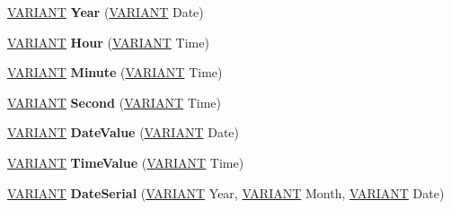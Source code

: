 \begin{DoxyCompactItemize}
\hyperlink{structtag_v_a_r_i_a_n_t}{V\+A\+R\+I\+A\+NT} {\bfseries Year} (\hyperlink{structtag_v_a_r_i_a_n_t}{V\+A\+R\+I\+A\+NT} Date)
\item 
\mbox{\label{interface_v_b_script___global_1_1_global_obj_aee82cbdab554729b176b380cff3f143f}} 
\hyperlink{structtag_v_a_r_i_a_n_t}{V\+A\+R\+I\+A\+NT} {\bfseries Hour} (\hyperlink{structtag_v_a_r_i_a_n_t}{V\+A\+R\+I\+A\+NT} Time)
\item 
\mbox{\label{interface_v_b_script___global_1_1_global_obj_a316ecab267814f6e0b081ad0740ccdc8}} 
\hyperlink{structtag_v_a_r_i_a_n_t}{V\+A\+R\+I\+A\+NT} {\bfseries Minute} (\hyperlink{structtag_v_a_r_i_a_n_t}{V\+A\+R\+I\+A\+NT} Time)
\item 
\mbox{\label{interface_v_b_script___global_1_1_global_obj_a0d2ee36f36cf62c7a64e74f054848795}} 
\hyperlink{structtag_v_a_r_i_a_n_t}{V\+A\+R\+I\+A\+NT} {\bfseries Second} (\hyperlink{structtag_v_a_r_i_a_n_t}{V\+A\+R\+I\+A\+NT} Time)
\item 
\mbox{\label{interface_v_b_script___global_1_1_global_obj_a481d0c971359566ee5661ef782550bd5}} 
\hyperlink{structtag_v_a_r_i_a_n_t}{V\+A\+R\+I\+A\+NT} {\bfseries Date\+Value} (\hyperlink{structtag_v_a_r_i_a_n_t}{V\+A\+R\+I\+A\+NT} Date)
\item 
\mbox{\label{interface_v_b_script___global_1_1_global_obj_acacd0567e03b9e4127a838db6a38ef10}} 
\hyperlink{structtag_v_a_r_i_a_n_t}{V\+A\+R\+I\+A\+NT} {\bfseries Time\+Value} (\hyperlink{structtag_v_a_r_i_a_n_t}{V\+A\+R\+I\+A\+NT} Time)
\item 
\mbox{\label{interface_v_b_script___global_1_1_global_obj_aaf3da47031ee6c176d3e193d513c8800}} 
\hyperlink{structtag_v_a_r_i_a_n_t}{V\+A\+R\+I\+A\+NT} {\bfseries Date\+Serial} (\hyperlink{structtag_v_a_r_i_a_n_t}{V\+A\+R\+I\+A\+NT} Year, \hyperlink{structtag_v_a_r_i_a_n_t}{V\+A\+R\+I\+A\+NT} Month, \hyperlink{structtag_v_a_r_i_a_n_t}{V\+A\+R\+I\+A\+NT} Date)
\item 
\mbox{\label{interface_v_b_script___global_1_1_global_obj_a01853239d04bad1aff957a0819a95dca}} 

\end{DoxyCompactItemize}
